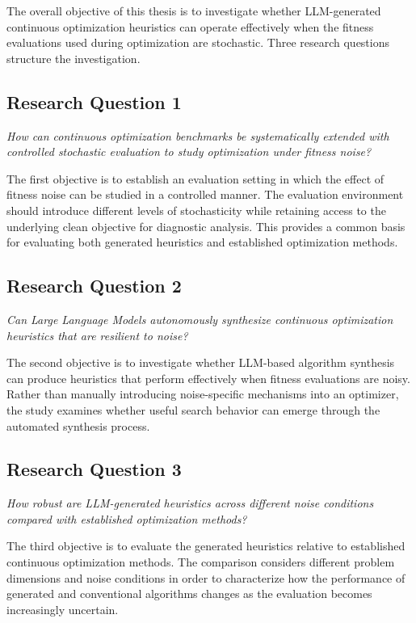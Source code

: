 The overall objective of this thesis is to investigate whether LLM-generated
continuous optimization heuristics can operate effectively when the fitness
evaluations used during optimization are stochastic. Three research questions
structure the investigation.

\subsection*{Research Question 1}

\textit{How can continuous optimization benchmarks be systematically
extended with controlled stochastic evaluation to study optimization
under fitness noise?}

The first objective is to establish an evaluation setting in which the effect of
fitness noise can be studied in a controlled manner. The evaluation environment
should introduce different levels of stochasticity while retaining access to the
underlying clean objective for diagnostic analysis. This provides a common basis
for evaluating both generated heuristics and established optimization methods.

\subsection*{Research Question 2}

\textit{Can Large Language Models autonomously synthesize continuous
optimization heuristics that are resilient to noise?}

The second objective is to investigate whether LLM-based algorithm synthesis can
produce heuristics that perform effectively when fitness evaluations are noisy.
Rather than manually introducing noise-specific mechanisms into an optimizer,
the study examines whether useful search behavior can emerge through the
automated synthesis process.

\subsection*{Research Question 3}

\textit{How robust are LLM-generated heuristics across different noise
conditions compared with established optimization methods?}

The third objective is to evaluate the generated heuristics relative to
established continuous optimization methods. The comparison considers different
problem dimensions and noise conditions in order to characterize how the
performance of generated and conventional algorithms changes as the evaluation
becomes increasingly uncertain.

